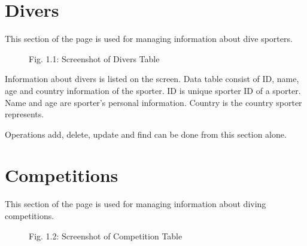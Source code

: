 \documentclass[a4paper,10pt,english]{sphinxmanual}
\begin{document}
\section{Divers}
\label{user/member5:divers}
This section of the page is used for managing information about dive sporters.
\begin{figure}[htbp]
\centering
\capstart

\caption{Fig. 1.1: Screenshot of Divers Table}\end{figure}

Information about divers is listed on the screen.
Data table consist of ID, name, age and country information of the sporter.
ID is unique sporter ID of a sporter.
Name and age are sporter's personal information.
Country is the country sporter represents.

Operations add, delete, update and find can be done from this section alone.


\section{Competitions}
\label{user/member5:competitions}
This section of the page is used for managing information about diving competitions.
\begin{figure}[htbp]
\centering
\capstart

\caption{Fig. 1.2: Screenshot of Competition Table}\end{figure}
\end{document}
